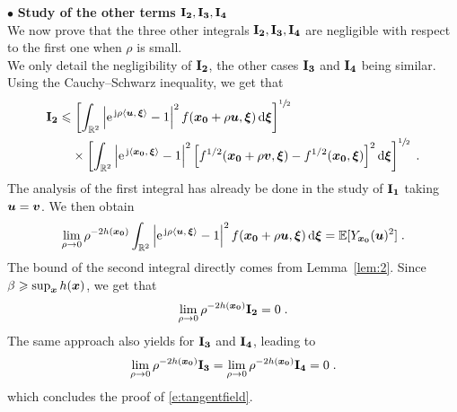 \documentclass{elsarticle}
\begin{document}
\noindent $\bullet$ \textbf{Study of the other terms $\mathbf{I_2},\mathbf{I_3},\mathbf{I_4}$}\\

We now prove that the three other integrals $\mathbf{I_2},\mathbf{I_3},\mathbf{I_4}$ are negligible with respect to the first one when $\rho$ is small.\\

\noindent We only detail the negligibility of $\mathbf{I_2}$, the other cases $\mathbf{I_3}$ and $\mathbf{I_4}$ being similar. Using the Cauchy--Schwarz inequality, we get that
\begin{align*}
&\mat{I_2}\leq \left[\int_{\mathbb{R}^2}\left|\expj{\rho \ip{\vect{u}}{\vect{\xi}}}-1\right|^2 f(\vect{x_0}+\rho \vect{u},\vect{\xi})\dif\vect{\xi}\right]^{\sfrac{1}{2}}\\
&\qquad \times \left[\int_{\mathbb{R}^2}\left|\expj{\ip{\vect{x_0}}{\vect{\xi}}}-1\right|^2\left[f^{1/2}(\vect{x_0}+\rho \vect{v},\vect{\xi})-f^{1/2}(\vect{x_0},\vect{\xi})\right]^2\dif \vect{\xi}\right]^{\sfrac{1}{2}}\;.
\end{align*}
The analysis of the first integral has already be done in the study of  $\mathbf{I_1}$ taking $\bm{u}=\bm{v}$. We then obtain
\begin{equation}
\label{eq:I2a}
\lim_{\rho\to 0}\rho^{-2h(\vect{x_0})}\int_{\mathbb{R}^2}\left|\expj{\rho \ip{\vect{u}}{\vect{\xi}}}-1\right|^2 f(\vect{x_0}+\rho \vect{u},\vect{\xi})\dif \vect{\xi}=\mathbb{E}[Y_{\vect{x_0}}(\vect{u})^2]\;.
\end{equation}
The bound of the second integral directly comes from Lemma~\ref{lem:2}. Since $\beta \geqslant \sup_{\bm{x}} h(\bm{x})$, we get that
$$
\lim_{\rho\to 0} \rho^{-2h(\bm{x_0})}\mathbf{I_2} = 0\;.
$$
\noindent
The same approach also yields for $\mathbf{I_3}$ and $\mathbf{I_4}$, leading to 
$$
\lim_{\rho\to 0} \rho^{-2h(\bm{x_0})}\mathbf{I_3} = \lim_{\rho\to 0} \rho^{-2h(\bm{x_0})}\mathbf{I_4}= 0\;.
$$
which concludes the proof of \eqref{e:tangentfield}.
\end{document}
